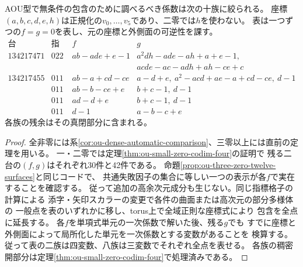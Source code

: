 \begin{corollary}
\label{cor:ou-one-two-ten-families}
AOU型で無条件の包含のために調べるべき係数は次の十族に絞られる。
座標$(a,b,c,d,e,h)$は正規化の$v_0,\ldots,v_5$であり、二零では$h$を使わない。
表は一つずつの$f=g=0$を表し、元の座標と外側面の可逆性を課す。
\[
\begin{array}{c|c|l|l}
\text{台}&\text{指定零}&f&g\\\hline
134217471&022&ab-ade+e-1&a^2dh-ade-ah+a+e-1,\\
&&&acde-ac-adh+ah-ce+c\\\hline
134217455&011&ab-a+cd-ce&a-d+e,\ a^2-acd+ae-a+cd-ce,\ d-1\\
&011&ab-b-ce+e&b+c-1,\ d-1\\
&011&ad-d+e&b+c-1,\ d-1\\
&011&d-1&a-b-c+e
\end{array}
\]
各族の残余はその真閉部分に含まれる。
\end{corollary}
\begin{proof}
全非零には系\ref{cor:ou-dense-automatic-comparison}、三零以上には直前の定理を用いる。
一・二零では定理\ref{thm:ou-small-zero-codim-four}の証明で
残る二台の$(f,g)$はそれぞれ30件と42件である。
命題\ref{prop:ou-three-zero-twelve-surfaces}と同じコードで、
共通失敗因子の集合に等しい一つの表示が各$f$で実在することを確認する。
従って追加の高余次元成分も生じない。同じ指標格子の計算による
添字・矢印スカラーの変更で各件の曲面または高次元の部分多様体の
一般点を表のいずれかに移し、torus上で全域正則な座標式により
包含を全点に延長する。
各$f$を単項式単元の一次係数で解いた後、残る$g$でも
すでに座標と外側面によって局所化した単元を一次係数とする変数があることを
検算する。従って表の二族は四変数、八族は三変数でそれぞれ全点を表せる。
各族の稠密開部分は定理\ref{thm:ou-small-zero-codim-four}で処理済みである。
\end{proof}

